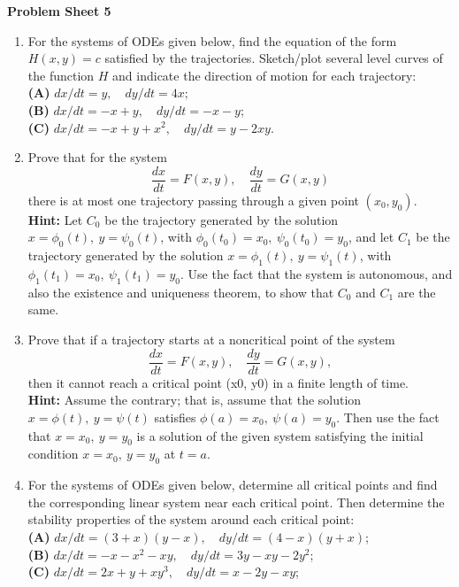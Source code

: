 \documentclass[11pt,a4paper]{article}
\begin{document}
	\begin{center}
		\textbf{Problem Sheet 5}
	\end{center}
	\begin{enumerate}
		\item For the systems of ODEs given below, find the equation of the form $H(x, y) = c$ satisfied by the trajectories. Sketch/plot several level curves of the function $H$ and indicate the direction of motion for each trajectory:\\
		\textbf{(A)} $dx/dt = y,\quad dy/dt = 4x$;\\
		\textbf{(B)} $dx/dt = -x + y,\quad dy/dt = -x - y$;\\
		\textbf{(C)} $dx/dt = -x + y + x^2,\quad dy/dt = y - 2xy$.
		\item Prove that for the system
		$$
		\frac{dx}{dt} = F(x,y),\quad \frac{dy}{dt} = G(x,y)
		$$
		there is at most one trajectory passing through a given point $(x_0, y_0)$.\\
		\textbf{Hint:} Let $C_0$ be the trajectory generated by the solution $x = \phi_0(t),\ y = \psi_0(t)$, with $\phi_0(t_0) = x_0,\ \psi_0(t_0) = y_0$, and let $C_1$ be the trajectory generated by the solution $x = \phi_1(t),\ y = \psi_1(t)$, with $\phi_1(t_1) = x_0,\ \psi_1(t_1) = y_0$. Use the fact that the system is autonomous, and also the existence and uniqueness theorem, to show that $C_0$ and $C_1$ are the same.
		\item Prove that if a trajectory starts at a noncritical point of the system
		$$
		\frac{dx}{dt} = F(x,y),\quad \frac{dy}{dt} = G(x,y),
		$$
		then it cannot reach a critical point (x0, y0) in a finite length of time.\\
		\textbf{Hint:} Assume the contrary; that is, assume that the solution $x = \phi(t),\ y = \psi(t)$ satisfies $\phi(a) = x_0,\ \psi(a) = y_0$. Then use the fact that $x = x_0,\ y = y_0$ is a solution of the given system satisfying the initial condition $x = x_0,\ y = y_0$ at $t = a$.
		\item For the systems of ODEs given below, determine all critical points and find the corresponding linear system near each critical point. Then determine the stability properties of the system around each critical point:\\
		\textbf{(A)} $dx/dt = (3 + x)(y - x),\quad dy/dt = (4 - x)(y + x)$;\\
		\textbf{(B)} $dx/dt = -x - x^2 - xy,\quad dy/dt = 3y - xy - 2y^2$;\\
		\textbf{(C)} $dx/dt = 2x + y + xy^3,\quad dy/dt = x - 2y - xy$;\\

\end{enumerate}
\end{document}
